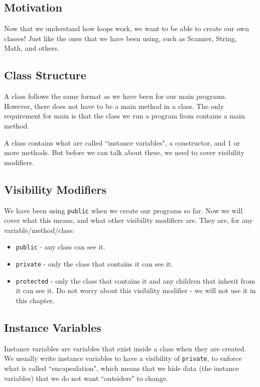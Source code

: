 
\subsection{Motivation}
Now that we understand how loops work, we want to be able to create our own classes! Just like the ones that we have been using, such as Scanner, String, Math, and others. 

\subsection{Class Structure}
A class follows the same format as we have been for our main programs. However, there does not have to be a main method in a class. The only requirement for main is that the class we run a program from contains a main method.

\par A class contains what are called ``instance variables", a constructor, and 1 or more methods. But before we can talk about these, we need to cover visibility modifiers.

\subsection{Visibility Modifiers}
We have been using \verb|public| when we create our programs so far. Now we will cover what this means, and what other visibility modifiers are. They are, for any variable/method/class:
\begin{itemize}
\item \verb|public| - any class can see it.
\item \verb|private| - only the class that contains it can see it.
\item \verb|protected| - only the class that contains it and any children that inherit from it can see it. Do not worry about this visibility modifier - we will not use it in this chapter.
\end{itemize}

\subsection{Instance Variables}
Instance variables are variables that exist inside a class when they are created. We usually write instance variables to have a visibility of \verb|private|, to enforce what is called ``encapsulation", which means that we hide data (the instance variables) that we do not want ``outsiders" to change. 

